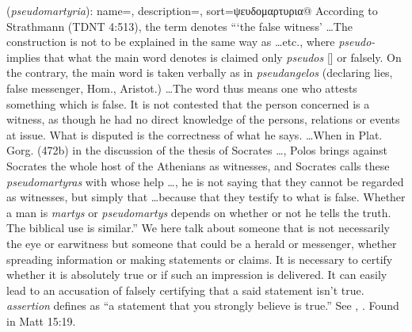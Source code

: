 \item[False assertion,]

(\textit{pseudomartyria}):
{
    name=,
    description={},
    sort=ψευδομαρτυρια@
}
According to Strathmann (TDNT 4:513), the term denotes ```the false witness' \ldots The construction is not to be explained in the same way as \ldots etc., where \emph{pseudo-} implies that what the main word denotes is claimed only \emph{pseudos} [] or falsely.  On the contrary, the main word is taken verbally as in \emph{pseudangelos} (declaring lies, false messenger, Hom., Aristot.) \ldots The word thus means one who attests something which is false. It is not contested that the person concerned is a witness, as though he had no direct knowledge of the persons, relations or events at issue. What is disputed is the correctness of what he says. \ldots When in Plat. Gorg. (472b) in the discussion of the thesis of Socrates \ldots, Polos brings against Socrates the whole host of the Athenians as witnesses, and Socrates calls these \emph{pseudomartyras} with whose help \ldots, he is not saying that they cannot be regarded as witnesses, but simply that \ldots because that they testify to what is false. Whether a man is \emph{martys} or \emph{pseudomartys} depends on whether or not he tells the truth. The biblical use is similar.''
We here talk about someone that is not necessarily the eye or earwitness but someone that could be a herald or messenger, whether spreading information or making statements or claims. It is necessary to certify whether it is absolutely true or if such an impression is delivered. It can easily lead to an accusation of falsely certifying that a said statement isn't true. \emph{assertion} defines as ``a statement that you strongly believe is true.'' See , .
Found in Matt 15:19.
